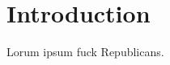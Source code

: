 \documentclass[dissertation.tex]{subfiles}
\begin{document}
\chapter{Introduction}
\label{chap:Introduction}

Lorum ipsum fuck Republicans.
\end{document}
